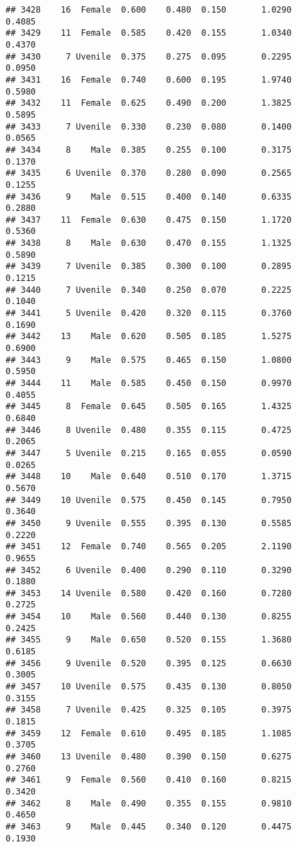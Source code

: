 \documentclass[
]{article}
\begin{document}
\begin{verbatim}
## 3428    16  Female  0.600    0.480  0.150       1.0290         0.4085
## 3429    11  Female  0.585    0.420  0.155       1.0340         0.4370
## 3430     7 Uvenile  0.375    0.275  0.095       0.2295         0.0950
## 3431    16  Female  0.740    0.600  0.195       1.9740         0.5980
## 3432    11  Female  0.625    0.490  0.200       1.3825         0.5895
## 3433     7 Uvenile  0.330    0.230  0.080       0.1400         0.0565
## 3434     8    Male  0.385    0.255  0.100       0.3175         0.1370
## 3435     6 Uvenile  0.370    0.280  0.090       0.2565         0.1255
## 3436     9    Male  0.515    0.400  0.140       0.6335         0.2880
## 3437    11  Female  0.630    0.475  0.150       1.1720         0.5360
## 3438     8    Male  0.630    0.470  0.155       1.1325         0.5890
## 3439     7 Uvenile  0.385    0.300  0.100       0.2895         0.1215
## 3440     7 Uvenile  0.340    0.250  0.070       0.2225         0.1040
## 3441     5 Uvenile  0.420    0.320  0.115       0.3760         0.1690
## 3442    13    Male  0.620    0.505  0.185       1.5275         0.6900
## 3443     9    Male  0.575    0.465  0.150       1.0800         0.5950
## 3444    11    Male  0.585    0.450  0.150       0.9970         0.4055
## 3445     8  Female  0.645    0.505  0.165       1.4325         0.6840
## 3446     8 Uvenile  0.480    0.355  0.115       0.4725         0.2065
## 3447     5 Uvenile  0.215    0.165  0.055       0.0590         0.0265
## 3448    10    Male  0.640    0.510  0.170       1.3715         0.5670
## 3449    10 Uvenile  0.575    0.450  0.145       0.7950         0.3640
## 3450     9 Uvenile  0.555    0.395  0.130       0.5585         0.2220
## 3451    12  Female  0.740    0.565  0.205       2.1190         0.9655
## 3452     6 Uvenile  0.400    0.290  0.110       0.3290         0.1880
## 3453    14 Uvenile  0.580    0.420  0.160       0.7280         0.2725
## 3454    10    Male  0.560    0.440  0.130       0.8255         0.2425
## 3455     9    Male  0.650    0.520  0.155       1.3680         0.6185
## 3456     9 Uvenile  0.520    0.395  0.125       0.6630         0.3005
## 3457    10 Uvenile  0.575    0.435  0.130       0.8050         0.3155
## 3458     7 Uvenile  0.425    0.325  0.105       0.3975         0.1815
## 3459    12  Female  0.610    0.495  0.185       1.1085         0.3705
## 3460    13 Uvenile  0.480    0.390  0.150       0.6275         0.2760
## 3461     9  Female  0.560    0.410  0.160       0.8215         0.3420
## 3462     8    Male  0.490    0.355  0.155       0.9810         0.4650
## 3463     9    Male  0.445    0.340  0.120       0.4475         0.1930

\end{verbatim}
\end{document}
